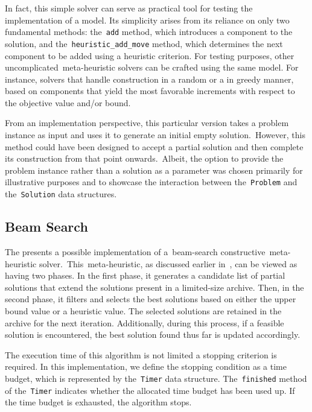 In fact, this simple solver can serve as practical tool for testing the
implementation of a model. Its simplicity arises from its reliance on only two
fundamental methods: the~\texttt{add} method, which introduces a component to
the solution, and the~\texttt{heuristic\_add\_move} method, which determines the
next component to be added using a heuristic criterion. For testing purposes,
other uncomplicated~\acrshort{meta-heuristic} solvers can be crafted using the
same model. For instance, solvers that handle construction in a random or a
in greedy manner, based on components that yield the most favorable increments
with respect to the objective value and/or bound.

From an implementation perspective, this particular version takes a problem
instance as input and uses it to generate an initial empty solution.~However,
this method could have been designed to accept a partial solution and then
complete its construction from that point onwards.~Albeit, the option
to provide the problem instance rather than a solution as a parameter was chosen
primarily for illustrative purposes and to showcase the interaction between
the~\texttt{Problem} and the~\texttt{Solution} data structures.

\subsection{Beam Search}
\label{subsec:beam-search-solver}

The  presents a possible implementation of a~\acrshort{beam-search}
constructive~\acrshort{meta-heuristic} solver.~This~\acrshort{meta-heuristic},
as discussed earlier in~, can be viewed as having two phases. In the
first phase, it generates a candidate list of partial solutions that extend the
solutions present in a limited-size archive. Then, in the second phase, it
filters and selects the best solutions based on either the upper bound value or
a heuristic value. The selected solutions are retained in the archive for the
next iteration. Additionally, during this process, if a feasible solution is
encountered, the best solution found thus far is updated accordingly.

The execution time of this algorithm is not limited a stopping criterion is
required. In this implementation, we define the stopping condition as a time
budget, which is represented by the~\texttt{Timer} data structure.
The~\texttt{finished} method of the~\texttt{Timer} indicates whether the
allocated time budget has been used up. If the time budget is exhausted, the
algorithm stops.

